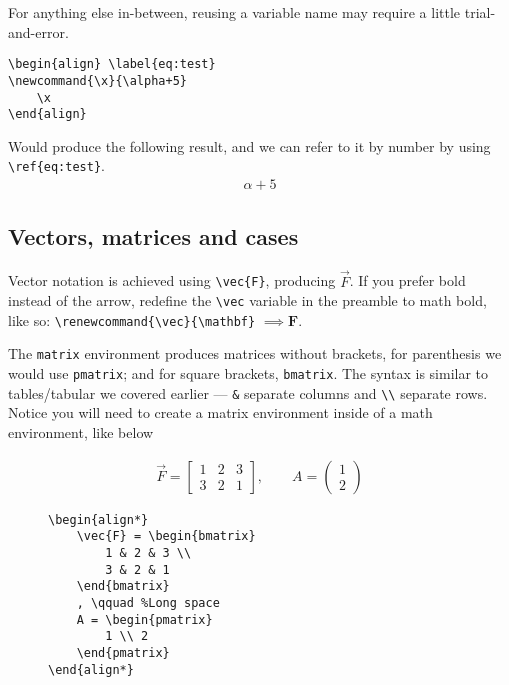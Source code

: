 For anything else in-between, reusing a variable name may require a little trial-and-error.

\begin{lstlisting}
\begin{align} \label{eq:test}
\newcommand{\x}{\alpha+5}
    \x
\end{align}
\end{lstlisting}
Would produce the following result, and we can refer to it by number by using \verb|\ref{eq:test}|.
\begin{align}
    \alpha+5
\end{align}
\subsection{Vectors, matrices and cases}
Vector notation is achieved using \verb|\vec{F}|, producing \(\vec{F}\).
If you prefer bold instead of the arrow, redefine the \verb|\vec| variable in the preamble to math bold, like so:
\verb|\renewcommand{\vec}{\mathbf}| \(\implies \mathbf{F}\).

The \verb|matrix| environment produces matrices without brackets,
for parenthesis we would use \texttt{pmatrix}; and for square brackets, \texttt{bmatrix}.
The syntax is similar to tables/tabular we covered earlier --- \verb|&| separate columns and \verb|\\| separate rows.
Notice you will need to create a matrix environment inside of a math environment, like below 
\begin{figure}[h] \centering
\begin{minipage}{0.45\textwidth}
    \begin{align*}
        \vec{F} = \begin{bmatrix}
            1 & 2 & 3 \\
            3 & 2 & 1 
        \end{bmatrix}
        , \qquad
        A = \begin{pmatrix}
            1 \\ 2
    \end{pmatrix}
    \end{align*}
\end{minipage}
\hfill
\begin{minipage}{0.45\textwidth}
\begin{lstlisting}
\begin{align*}
    \vec{F} = \begin{bmatrix}
        1 & 2 & 3 \\
        3 & 2 & 1 
    \end{bmatrix}
    , \qquad %Long space
    A = \begin{pmatrix}
        1 \\ 2
    \end{pmatrix} 
\end{align*}
\end{lstlisting}
\end{minipage}

\end{figure}



